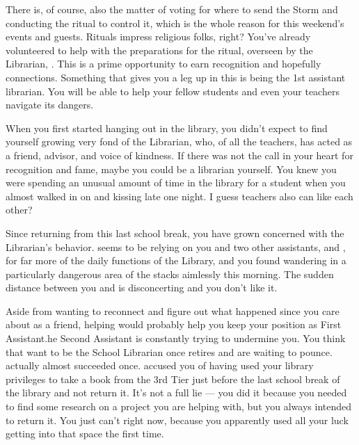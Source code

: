 \documentclass[char]{GL2020}
\begin{document}
There is, of course, also the matter of voting for where to send the Storm and conducting the ritual to control it, which is the whole reason for this weekend's events and guests. Rituals impress religious folks, right? You've already volunteered to help with the preparations for the ritual, overseen by the Librarian, \cLibrarian{\full}. This is a prime opportunity to earn recognition and hopefully connections. Something that gives you a leg up in this is being the 1st assistant librarian. You will be able to help your fellow students and even your teachers navigate its dangers.

 When you first started hanging out in the library, you didn’t expect to find yourself growing very fond of the Librarian, who, of all the teachers, has acted as a friend, advisor, and voice of kindness. If there was not the call in your heart for recognition and fame, maybe you could be a librarian yourself. You knew you were spending an unusual amount of time in the library for a student when you almost walked in on \cInterpol{\full} and \cLibrarian{} kissing late one night. I guess teachers also can like each other?

 Since returning from this last school break, you have grown concerned with the Librarian’s behavior. \cLibrarian{\They} seems to be relying on you and \cLibrarian{\their} two other assistants, \cPresident{\full} and \cLibAssist{\full}, for far more of the daily functions of the Library, and you found \cLibrarian{\them} wandering in a particularly dangerous area of the stacks aimlessly this morning.  The sudden distance between you and \cLibrarian{} is disconcerting and you don’t like it. 

Aside from wanting to reconnect and figure out what happened since you care about \cLibrarian{} as a friend, helping  \cLibrarian{\them} would probably help you keep your position as First Assistant.he Second Assistant \cLibAssist{\full} is constantly trying to undermine you. You think that \cLibAssist{\they} want to be the School Librarian once \cLibrarian{} retires and are waiting to pounce. \cLibAssist{\They} actually almost succeeded once. \cLibAssist{} accused you of having used your library privileges to take a book from the 3rd Tier just before the last school break of the library and not return it. It's not a full lie — you did it because you needed to find some research on a project you are helping \cFlowPriest{\full} with, but you always intended to return it. You just can’t right now, because you apparently used all your luck getting into that space the first time. 
\end{document}
